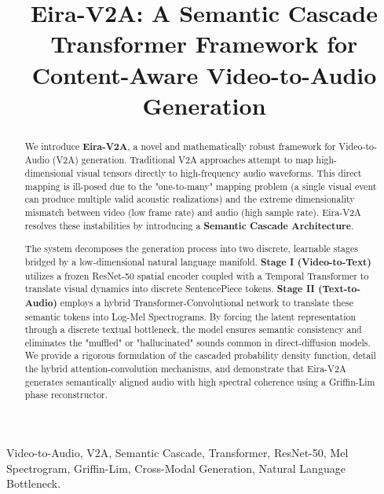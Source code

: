 \documentclass[conference, onecolumn]{IEEEtran}
\title{Eira-V2A: A Semantic Cascade Transformer Framework for Content-Aware Video-to-Audio Generation}
\author{
\IEEEauthorblockN{Rakesh S B}
\IEEEauthorblockA{
\textit{BOCK Health}\\
Bangalore, India\\
founder.bock@gmail.com}
\and
\IEEEauthorblockN{Fasi Owaiz Ahmed}
\IEEEauthorblockA{
\textit{BOCK Health}\\
Bangalore, India\\
fasiahmedpro@gmail.com}
}
\begin{document}
\maketitle

\begin{abstract}
We introduce \textbf{Eira-V2A}, a novel and mathematically robust framework for Video-to-Audio (V2A) generation. Traditional V2A approaches attempt to map high-dimensional visual tensors directly to high-frequency audio waveforms. This direct mapping is ill-posed due to the "one-to-many" mapping problem (a single visual event can produce multiple valid acoustic realizations) and the extreme dimensionality mismatch between video (low frame rate) and audio (high sample rate). Eira-V2A resolves these instabilities by introducing a \textbf{Semantic Cascade Architecture}.

The system decomposes the generation process into two discrete, learnable stages bridged by a low-dimensional natural language manifold. \textbf{Stage I (Video-to-Text)} utilizes a frozen ResNet-50 spatial encoder coupled with a Temporal Transformer to translate visual dynamics into discrete SentencePiece tokens. \textbf{Stage II (Text-to-Audio)} employs a hybrid Transformer-Convolutional network to translate these semantic tokens into Log-Mel Spectrograms. By forcing the latent representation through a discrete textual bottleneck, the model ensures semantic consistency and eliminates the "muffled" or "hallucinated" sounds common in direct-diffusion models. We provide a rigorous formulation of the cascaded probability density function, detail the hybrid attention-convolution mechanisms, and demonstrate that Eira-V2A generates semantically aligned audio with high spectral coherence using a Griffin-Lim phase reconstructor.
\end{abstract}

\begin{IEEEkeywords}
Video-to-Audio, V2A, Semantic Cascade, Transformer, ResNet-50, Mel Spectrogram, Griffin-Lim, Cross-Modal Generation, Natural Language Bottleneck.
\end{IEEEkeywords}

\end{document}
